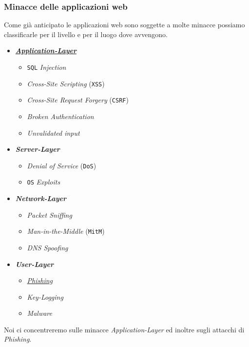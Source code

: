        \subsubsection{Minacce delle applicazioni web}
            Come già anticipato le applicazioni web sono soggette a molte minacce possiamo classificarle per il livello e per il luogo dove avvengono.
            \begin{itemize}
                \item \underline{\textbf{\textit{Application-Layer}}} \begin{itemize}
                    \item \texttt{SQL} \textit{Injection}
                    \item \textit{Cross-Site Scripting} (\texttt{XSS})
                    \item \textit{Cross-Site Request Forgery} (\texttt{CSRF})
                    \item \textit{Broken Authentication}
                    \item \textit{Unvalidated input}
                \end{itemize}
                \item \textbf{\textit{Server-Layer}} \begin{itemize}
                    \item \textit{Denial of Service} (\texttt{DoS})
                    \item \texttt{OS} \textit{Exploits}
                \end{itemize}
                \item \textbf{\textit{Network-Layer}} \begin{itemize}
                    \item \textit{Packet Sniffing}
                    \item \textit{Man-in-the-Middle} (\texttt{MitM})
                    \item \textit{DNS Spoofing}
                \end{itemize}
                \item \textbf{\textit{User-Layer}} \begin{itemize}
                    \item \underline{\textit{Phishing}}
                    \item \textit{Key-Logging}
                    \item \textit{Malware}
                \end{itemize}
            \end{itemize}
            Noi ci concentreremo sulle minacce \textit{Application-Layer} ed inoltre sugli attacchi di \textit{Phishing}.
